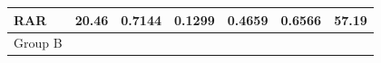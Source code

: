 \begin{tabular}{lllllll}
\toprule
RAR & 20.46 & 0.7144 & 0.1299 & 0.4659 & 0.6566 & 57.19 \\
\midrule
Group B &  &  &  &  &  &  \\
\bottomrule
\end{tabular}
